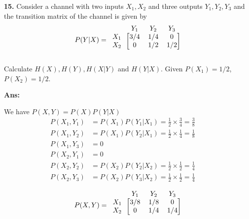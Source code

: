\documentclass[12pt]{article}
\begin{document}
\vspace{0.5cm}
\noindent \textbf{15.} Consider a channel with two inputs $X_1, X_2$ and three outputs $Y_1, Y_2, Y_3$ and the transition matrix of the channel is given by
$$P(Y|X) = \begin{blockarray}{cccc}
		& Y_1 & Y_2 & Y_3 \\
		\begin{block}{c[ccc]}
			X_1 & 3/4 & 1/4 & 0 \\
			X_2 & 0 & 1/2 & 1/2 \\
		\end{block}
	\end{blockarray}$$

Calculate $H(X), H(Y), H(X|Y)$ and $H(Y|X)$. Given $P(X_1) = 1/2$, $P(X_2) = 1/2$.

\textbf{Ans:}

We have $P(X,Y) = P(X)P(Y|X)$
\begin{align*}
	P(X_1, Y_1) & = P(X_1)P(Y_1|X_1) = \frac{1}{2} \times \frac{3}{4} = \frac{3}{8}      \\
	P(X_1, Y_2) & = P(X_1)P(Y_2|X_1) = \frac{1}{2} \times \frac{1}{4} = \frac{1}{8}      \\
	P(X_1, Y_3) & = 0                                                                    \\
	P(X_2, Y_1) & = 0                                                                    \\
	P(X_2, Y_2) & = P(X_2)P(Y_2|X_2) = \frac{1}{2} \times \frac{1}{2} = \frac{1}{4}      \\
	P(X_2, Y_3) & = P(X_2)P(Y_3|X_2) = \frac{1}{2} \times \frac{1}{2} = \frac{1}{4} &  &
\end{align*}

$$P(X,Y) = \begin{blockarray}{cccc}
		& Y_1 & Y_2 & Y_3 \\
		\begin{block}{c[ccc]}
			X_1 & 3/8 & 1/8 & 0 \\
			X_2 & 0 & 1/4 & 1/4 \\
		\end{block}
	\end{blockarray}$$
\end{document}
